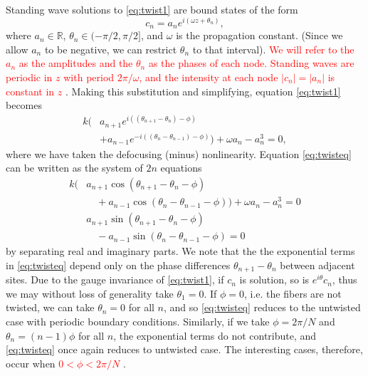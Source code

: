 \documentclass[reprint, amsmath,amssymb,aps,pra]{revtex4-2}
\def\R{{\mathbb R}}
\renewcommand{\revised}[1]{ \textcolor{red}{#1} }
\begin{document}
Standing wave solutions to \cref{eq:twist1} are bound states of the form
\begin{equation}\label{eq:ansatz1}
c_n = a_n e^{i (\omega z + \theta_n) },
\end{equation}
where $a_n \in \R$, $\theta_n \in (-\pi/2, \pi/2]$, and $\omega$ is the propagation constant. (Since we allow $a_n$ to be negative, we can restrict $\theta_n$ to that interval). \revised{We will refer to the $a_n$ as the amplitudes and the $\theta_n$ as the phases of each node. Standing waves are periodic in $z$ with period $2\pi/\omega$, and the intensity at each node $|c_n| = |a_n|$ is constant in $z$}.
Making this substitution and simplifying, equation \cref{eq:twist1} becomes
\begin{equation}\label{eq:twisteq}
\begin{aligned}
k\Big( &a_{n+1} e^{i((\theta_{n+1}-\theta_n)-\phi)} \\
&+ a_{n-1} e^{-i((\theta_n - \theta_{n-1})-\phi)}\Big) + \omega a_n - a_n^3 = 0,
\end{aligned}
\end{equation}
where we have taken the defocusing (minus) nonlinearity. Equation \cref{eq:twisteq} can be written as the system of $2n$ equations
\begin{equation}\label{eq:twisteqreal}
\begin{aligned}
k\big( &a_{n+1} \cos(\theta_{n+1}-\theta_n-\phi) \\
&\quad+a_{n-1} \cos(\theta_n - \theta_{n-1}-\phi)\big) + \omega a_n -  a_n^3 = 0 \\\
&a_{n+1} \sin(\theta_{n+1}-\theta_n-\phi) \\
&\quad-a_{n-1} \sin(\theta_n - \theta_{n-1}-\phi) = 0
\end{aligned}
\end{equation}
by separating real and imaginary parts. We note that the the exponential terms in \cref{eq:twisteq} depend only on the phase differences $\theta_{n+1}-\theta_n$ between adjacent sites. Due to the gauge invariance of \cref{eq:twist1}, if $c_n$ is solution, so is $e^{i \theta} c_n$, thus we may without loss of generality take $\theta_1 = 0$. If $\phi = 0$, i.e. the fibers are not twisted, we can take $\theta_n = 0$ for all $n$, and so \cref{eq:twisteq} reduces to the untwisted case with periodic boundary conditions. Similarly, if we take $\phi = 2 \pi/N$ and $\theta_n = (n-1)\phi$ for all $n$, the exponential terms do not contribute, and \cref{eq:twisteq} once again reduces to untwisted case. The interesting cases, therefore, occur when \revised{$0 < \phi < 2 \pi/N$}. 
\end{document}
